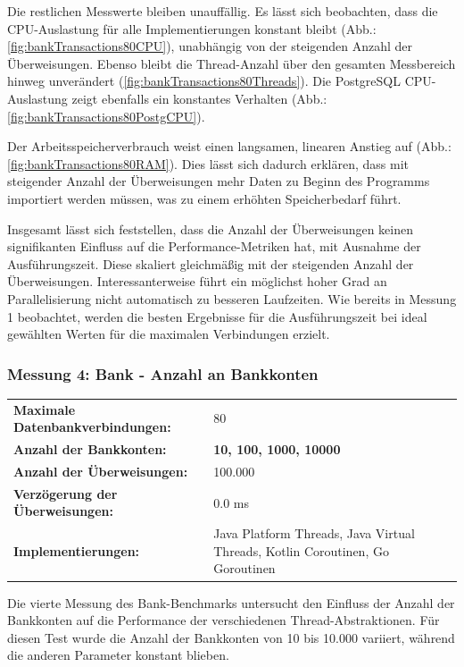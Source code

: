 \documentclass[fontsize=12pt,paper=a4,twoside=semi,parskip=half-,headsepline,headinclude]{scrreprt}
\begin{document}
Die restlichen Messwerte bleiben unauffällig. Es lässt sich beobachten, dass die CPU-Aus\-las\-tung für alle Implementierungen konstant bleibt (Abb.: \ref{fig:bankTransactions80CPU}), unabhängig von der steigenden Anzahl der Überweisungen. Ebenso bleibt die Thread-Anzahl über den gesamten Messbereich hinweg unverändert (\ref{fig:bankTransactions80Threads}). Die PostgreSQL CPU-Auslastung zeigt ebenfalls ein konstantes Verhalten (Abb.: \ref{fig:bankTransactions80PostgCPU}).

Der Arbeitsspeicherverbrauch weist einen langsamen, linearen Anstieg auf (Abb.: \ref{fig:bankTransactions80RAM}). Dies lässt sich dadurch erklären, dass mit steigender Anzahl der Überweisungen mehr Daten zu Beginn des Programms importiert werden müssen, was zu einem erhöhten Speicherbedarf führt.

Insgesamt lässt sich feststellen, dass die Anzahl der Überweisungen keinen signifikanten Einfluss auf die Performance-Metriken hat, mit Ausnahme der Ausführungszeit. Diese skaliert gleichmäßig mit der steigenden Anzahl der Überweisungen. Interessanterweise führt ein möglichst hoher Grad an Parallelisierung nicht automatisch zu besseren Laufzeiten. Wie bereits in Messung 1 beobachtet, werden die besten Ergebnisse für die Ausführungszeit bei ideal gewählten Werten für die maximalen Verbindungen erzielt.

\subsubsection{Messung 4: Bank - Anzahl an Bankkonten}

\begin{tabularx}{\textwidth}{@{}lX@{}}
	\textbf{Maximale Datenbankverbindungen:} & 80 \\
	\textbf{Anzahl der Bankkonten:} & \textbf{10, 100, 1000, 10000} \\
	\textbf{Anzahl der Überweisungen:} & 100.000 \\
	\textbf{Verzögerung der Überweisungen:} & 0.0 ms \\
	\textbf{Implementierungen:} & Java Platform Threads, Java Virtual Threads, Kotlin Coroutinen, Go Goroutinen
\end{tabularx}

Die vierte Messung des Bank-Benchmarks untersucht den Einfluss der Anzahl der Bankkonten auf die Performance der verschiedenen Thread-Abstraktionen. Für diesen Test wurde die Anzahl der Bankkonten von 10 bis 10.000 variiert, während die anderen Parameter konstant blieben.
\end{document}
